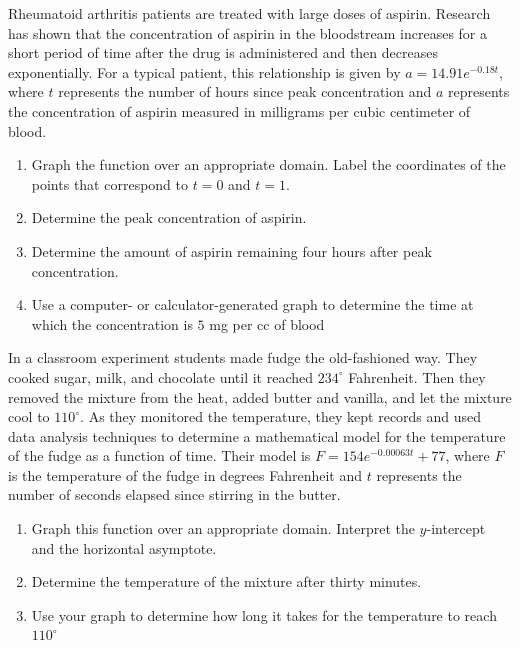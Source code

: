 \documentclass[10pt,]{book}
\theoremstyle{ptxdefinitionnotitle}
\theoremstyle{ptxdefinitiontitle}
\theoremstyle{ptxdefinitionnotitle}
\theoremstyle{ptxdefinitiontitle}
\theoremstyle{ptxdefinitionnotitle}
\theoremstyle{ptxdefinitiontitle}
\numberwithin{equation}{section}
\begin{document}
\begin{divisionexercise}{5}\hypertarget{exercise-66}{}
\hypertarget{p-262}{}%
Rheumatoid arthritis patients are treated with large doses of aspirin.  Research has shown that the concentration of aspirin in the bloodstream increases for a short period of time after the drug is administered and then decreases exponentially.  For a typical patient, this relationship is given by \(a=14.91e^{-0.18t}\), where \(t\) represents the number of hours since peak concentration and \(a\) represents the concentration of aspirin measured in milligrams per cubic centimeter of blood.%
\leavevmode%
\begin{enumerate}[label=(\alph*)]
\item\hypertarget{li-142}{}Graph the function over an appropriate domain. Label the coordinates of the points that correspond to \(t=0\) and \(t=1\).%
\item\hypertarget{li-143}{}Determine the peak concentration of aspirin.%
\item\hypertarget{li-144}{}Determine the amount of aspirin remaining four hours after peak concentration.%
\item\hypertarget{li-145}{}Use a computer- or calculator-generated graph to determine the time at which the concentration is \(5\) mg per cc of blood%
\end{enumerate}
\end{divisionexercise}%
\begin{divisionexercise}{6}\hypertarget{exercise-67}{}
\hypertarget{p-263}{}%
In a classroom experiment students made fudge the old-fashioned way.  They cooked sugar, milk, and chocolate until it reached \(234^\circ\) Fahrenheit.  Then they removed the mixture from the heat, added butter and vanilla, and let the mixture cool to \(110^\circ\).  As they monitored the temperature, they kept records and used data analysis techniques to determine a mathematical model for the temperature of the fudge as a function of time.  Their model is \(F = 154e^{-0.00063t} + 77\), where \(F\) is the temperature of the fudge in degrees Fahrenheit and \(t\) represents the number of seconds elapsed since stirring in the butter.%
\leavevmode%
\begin{enumerate}[label=(\alph*)]
\item\hypertarget{li-146}{}Graph this function over an appropriate domain.  Interpret the \(y\)-intercept and the horizontal asymptote.%
\item\hypertarget{li-147}{}Determine the temperature of the mixture after thirty minutes.%
\item\hypertarget{li-148}{}Use your graph to determine how long it takes for the temperature to reach \(110^\circ\)%
\end{enumerate}
\end{divisionexercise}%
\end{document}
